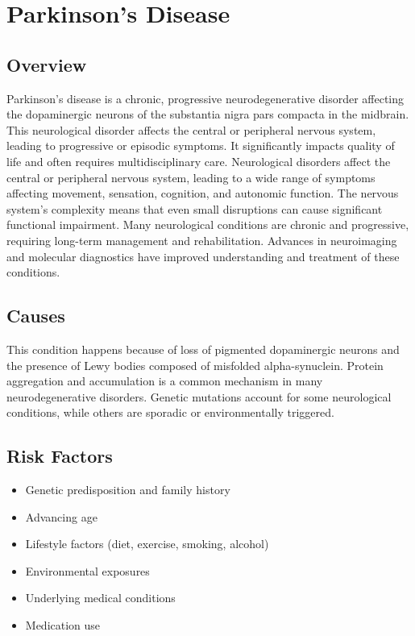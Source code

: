 \chapter{Parkinson's Disease}
\label{sec:Parkinson's Disease}

\section{Overview}
Parkinson's disease is a chronic, progressive neurodegenerative disorder affecting the dopaminergic neurons of the substantia nigra pars compacta in the midbrain. This neurological disorder affects the central or peripheral nervous system, leading to progressive or episodic symptoms. It significantly impacts quality of life and often requires multidisciplinary care. Neurological disorders affect the central or peripheral nervous system, leading to a wide range of symptoms affecting movement, sensation, cognition, and autonomic function. The nervous system's complexity means that even small disruptions can cause significant functional impairment. Many neurological conditions are chronic and progressive, requiring long-term management and rehabilitation. Advances in neuroimaging and molecular diagnostics have improved understanding and treatment of these conditions.
\section{Causes}
This condition happens because of loss of pigmented dopaminergic neurons and the presence of Lewy bodies composed of misfolded alpha-synuclein.    Protein aggregation and accumulation is a common mechanism in many neurodegenerative disorders.  Genetic mutations account for some neurological conditions, while others are sporadic or environmentally triggered.   
\section{Risk Factors}
\begin{itemize}[noitemsep]
  \item Genetic predisposition and family history
  \item Advancing age
  \item Lifestyle factors (diet, exercise, smoking, alcohol)
  \item Environmental exposures
  \item Underlying medical conditions
  \item Medication use
\end{itemize}

